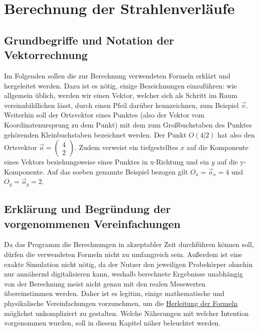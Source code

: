 \documentclass[reducespace,stylepage,semiarbeit]{spezidoc}
\newcommand{\vect}[2]{\begin{pmatrix}#1\\#2\end{pmatrix}}
\begin{document}
\newpage

\section{Berechnung der Strahlenverläufe}

\subsection{Grundbegriffe und Notation der Vektorrechnung}
Im Folgenden sollen die zur Berechnung verwendeten Formeln erklärt und hergeleitet werden. 
Dazu ist es nötig, einige Bezeichnungen einzuführen: wie allgemein üblich, werden wir einen Vektor, welcher sich als \glqq Schritt\grqq{} im Raum versinnbildlichen lässt, durch einen Pfeil darüber kennzeichnen, zum Beispiel $\vec{v}$. 
Weiterhin soll der Ortsvektor eines Punktes (also der Vektor vom Koordinatenursprung zu dem Punkt) mit dem zum Großbuchstaben des Punktes gehörenden Kleinbuchstaben bezeichnet werden. Der Punkt $O(4|2)$ hat also den Ortsvektor $\vec{o} = \vect{4}{2}$. 
Zudem verweist ein tiefgestelltes $x$ auf die Komponente eines Vektors beziehungsweise eines Punktes in x-Richtung und ein $y$ auf die y-Komponente. 
Auf das soeben genannte Beispiel bezogen gilt $O_x = \vec{o}_x = 4$ und $O_y = \vec{o}_y = 2$.

\subsection{Erklärung und Begründung der vorgenommenen Vereinfachungen}
Da das Programm die Berechnungen in akzeptabler Zeit durchführen können soll, dürfen die verwendeten Formeln nicht zu umfangreich sein. 
Außerdem ist eine exakte Simulation nicht nötig, da der Nutzer den jeweiligen Probekörper ohnehin nur annähernd digitalisieren kann, weshalb berechnete Ergebnisse unabhängig von der Berechnung meist nicht genau mit den realen Messwerten übereinstimmen werden. 
Daher ist es legitim, einige mathematische und physikalische Vereinfachungen vorzunehmen, um die \hyperref[sec:herleitung]{Herleitung der Formeln} möglichst unkompliziert zu gestalten. 
Welche Näherungen mit welcher Intention vorgenommen wurden, soll in diesem Kapitel näher beleuchtet werden.
\end{document}
